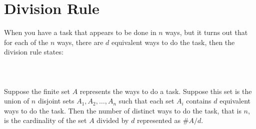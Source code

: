 \documentclass[a4paper]{exam}
\begin{document}
\section*{Division Rule}
    When you have a task that appears to be done in $n$ ways, but it turns out that for each of the $n$ ways, there are $d$ equivalent ways to do the task, then the division rule states:\\\\
    \noindent{}\\\\

    Suppose the finite set $A$ represents the ways to do a task. Suppose this set is the union of $n$ disjoint sets $A_1, A_2, \ldots, A_n$ such that each set $A_i$ contains $d$ equivalent ways to do the task. Then the number of distinct ways to do the task, that is $n$, is the cardinality of the set $A$ divided by $d$ represented as $\#A/d$. 
\end{document}
